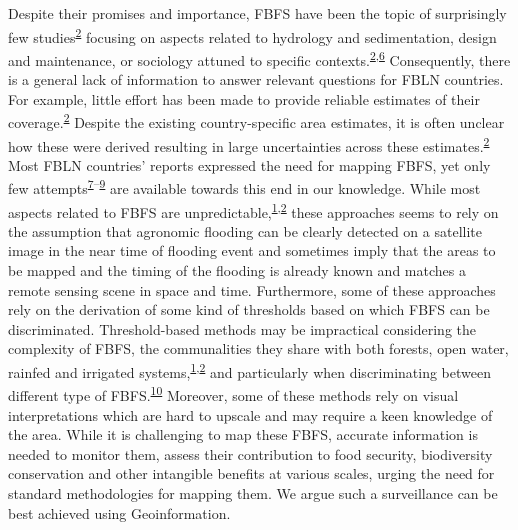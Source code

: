 \documentclass[12pt,oneside]{article}
\begin{document}
Despite their promises and importance, FBFS have been the topic of surprisingly few studies\textsuperscript{\protect\hyperlink{ref-VanSteenbergen_et_al_2010}{2}} focusing on aspects related to hydrology and sedimentation, design and maintenance, or sociology attuned to specific contexts.\textsuperscript{\protect\hyperlink{ref-VanSteenbergen_et_al_2010}{2},\protect\hyperlink{ref-Haile_2010}{6}} Consequently, there is a general lack of information to answer relevant questions for FBLN countries. For example, little effort has been made to provide reliable estimates of their coverage.\textsuperscript{\protect\hyperlink{ref-VanSteenbergen_et_al_2010}{2}} Despite the existing country-specific area estimates, it is often unclear how these were derived resulting in large uncertainties across these estimates.\textsuperscript{\protect\hyperlink{ref-VanSteenbergen_et_al_2010}{2}} Most FBLN countries' reports expressed the need for mapping FBFS, yet only few attempts\textsuperscript{\protect\hyperlink{ref-Ghebreamlak_et_al_2018}{7}--\protect\hyperlink{ref-Theilen-Willige_et_al_2015}{9}} are available towards this end in our knowledge. While most aspects related to FBFS are unpredictable,\textsuperscript{\protect\hyperlink{ref-Puertas_et_al_2011}{1},\protect\hyperlink{ref-VanSteenbergen_et_al_2010}{2}} these approaches seems to rely on the assumption that agronomic flooding can be clearly detected on a satellite image in the near time of flooding event and sometimes imply that the areas to be mapped and the timing of the flooding is already known and matches a remote sensing scene in space and time. Furthermore, some of these approaches rely on the derivation of some kind of thresholds based on which FBFS can be discriminated. Threshold-based methods may be impractical considering the complexity of FBFS, the communalities they share with both forests, open water, rainfed and irrigated systems,\textsuperscript{\protect\hyperlink{ref-Puertas_et_al_2011}{1},\protect\hyperlink{ref-VanSteenbergen_et_al_2010}{2}} and particularly when discriminating between different type of FBFS.\textsuperscript{\protect\hyperlink{ref-Boschetti_et_al_2014}{10}} Moreover, some of these methods rely on visual interpretations which are hard to upscale and may require a keen knowledge of the area. While it is challenging to map these FBFS, accurate information is needed to monitor them, assess their contribution to food security, biodiversity conservation and other intangible benefits at various scales, urging the need for standard methodologies for mapping them. We argue such a surveillance can be best achieved using Geoinformation.
\end{document}
